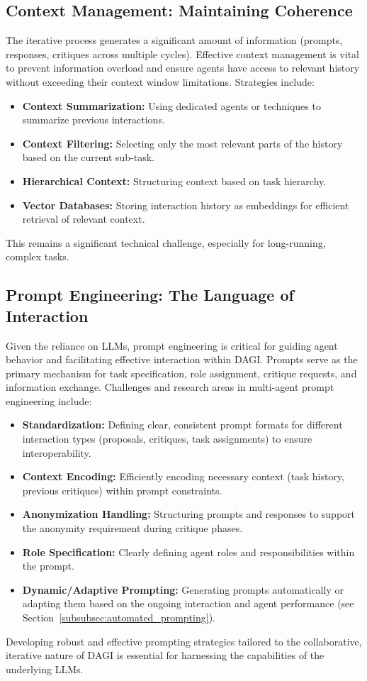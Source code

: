 \documentclass[12pt]{amsart}
\begin{document}
\subsection{Context Management: Maintaining Coherence}
The iterative process generates a significant amount of information (prompts, responses, critiques across multiple cycles). Effective context management is vital to prevent information overload and ensure agents have access to relevant history without exceeding their context window limitations. Strategies include:
\begin{itemize}[leftmargin=*]
    \item \textbf{Context Summarization:} Using dedicated agents or techniques to summarize previous interactions.
    \item \textbf{Context Filtering:} Selecting only the most relevant parts of the history based on the current sub-task.
    \item \textbf{Hierarchical Context:} Structuring context based on task hierarchy.
    \item \textbf{Vector Databases:} Storing interaction history as embeddings for efficient retrieval of relevant context.
\end{itemize}
This remains a significant technical challenge, especially for long-running, complex tasks.

\subsection{Prompt Engineering: The Language of Interaction}
Given the reliance on LLMs, prompt engineering is critical for guiding agent behavior and facilitating effective interaction within DAGI. Prompts serve as the primary mechanism for task specification, role assignment, critique requests, and information exchange. Challenges and research areas in multi-agent prompt engineering include:
\begin{itemize}[leftmargin=*]
    \item \textbf{Standardization:} Defining clear, consistent prompt formats for different interaction types (proposals, critiques, task assignments) to ensure interoperability.
    \item \textbf{Context Encoding:} Efficiently encoding necessary context (task history, previous critiques) within prompt constraints.
    \item \textbf{Anonymization Handling:} Structuring prompts and responses to support the anonymity requirement during critique phases.
    \item \textbf{Role Specification:} Clearly defining agent roles and responsibilities within the prompt.
    \item \textbf{Dynamic/Adaptive Prompting:} Generating prompts automatically or adapting them based on the ongoing interaction and agent performance (see Section~\ref{subsubsec:automated_prompting}).
\end{itemize}
Developing robust and effective prompting strategies tailored to the collaborative, iterative nature of DAGI is essential for harnessing the capabilities of the underlying LLMs.
\end{document}
